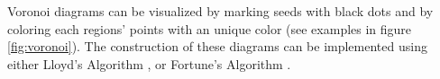 \vspace{-0.5cm} %

Voronoi diagrams can be visualized by marking seeds with black dots and by coloring each regions' points with an unique color (see examples in figure \ref{fig:voronoi}).
The construction of these diagrams can be implemented using either Lloyd's Algorithm \cite{voronoi_lloyd}, or Fortune's Algorithm \cite{voronoi_fortune}. 